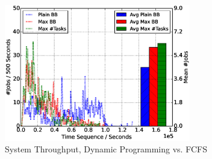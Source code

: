 \begin{figure}[!t]
        \centering
        \includegraphics[width=3.2in]{DrawDPvsFIFO/1000jobs_dp_vs_fifo_throughput}
        \caption{System Throughput, Dynamic Programming vs. FCFS}
        \label{Fig:DPvsFIFOThroughput}
\end{figure}




